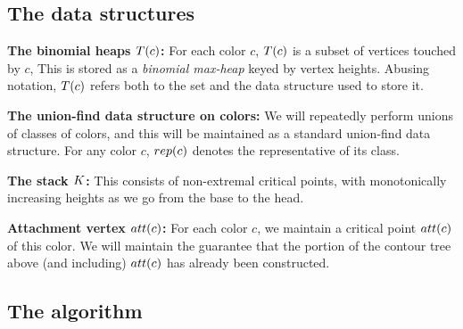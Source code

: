 

\subsection{The data structures} \label{sec:struct}

\noindent
{\bf The binomial heaps $T(c)$:} For each color $c$, $T(c)$ is a subset of vertices touched by $c$,
This is stored as a \emph{binomial max-heap} keyed by vertex heights. Abusing notation, $T(c)$ refers
both to the set and the data structure used to store it.


\medskip
\noindent
{\bf The union-find data structure on colors:} We will repeatedly perform unions
of classes of colors, and this will be maintained as a standard union-find data structure.
For any color $c$, $rep(c)$ denotes the representative of its class. 

\medskip
\noindent
{\bf The stack $K$:} This consists of non-extremal critical points, with monotonically increasing
heights as we go from the base to the head.

\medskip
\noindent
{\bf Attachment vertex $att(c)$:} For each color $c$, we maintain a critical point $att(c)$ of this color.
We will maintain the guarantee that the portion of the contour tree above (and including) $att(c)$ has already been constructed.

	
\subsection{The algorithm} \label{sec:algo}

